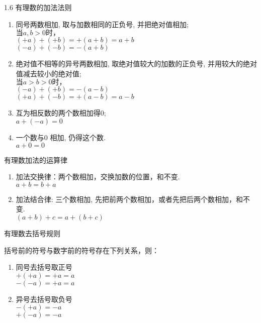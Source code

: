 \documentclass[aspectratio=169]{ctexbeamer} %
\date{\today}
\begin{document}
\begin{frame}[t]{1.6 有理数的加法法则}
\begin{spacing}{1.1} %
\normalsize
\begin{enumerate}[label={\arabic*.}]
\item 同号两数相加, 取与加数相同的正负号, 并把绝对值相加; \\
$\text{当}a,b  > 0\text{时，}$ \\
$(+a) + (+b) = +(a+b) = a + b$ \\
$(-a) + (-b) = -(a+b)$ \\
\item 绝对值不相等的异号两数相加, 取绝对值较大的加数的正负号, 并用较大的绝对值减去较小的绝对值; \\
$\text{当}a > b > 0\text{时，}$ \\
$(-a) + (+b) = -(a-b)$ \\
$(+a) + (-b) = +(a-b) = a - b$ \\
\item 互为相反数的两个数相加得0; \\
 $a + (-a) = 0$ \\
\item 一个数与0 相加, 仍得这个数. \\
$a + 0 = 0 $\\
\end{enumerate}
\end{spacing}
\end{frame}

\begin{frame}[t]{有理数加法的运算律}
\begin{spacing}{1.5} %
\Large
\begin{enumerate}[label={\arabic*.}]
\item 加法交换律：两个数相加，交换加数的位置，和不变. \\
$a + b = b + a$
\item 加法结合律: 三个数相加, 先把前两个数相加，或者先把后两个数相加，和不变. \\
$(a + b) + c = a + (b + c)$
\end{enumerate}
\end{spacing}
\end{frame}

\begin{frame}[t]{有理数去括号规则}
\begin{spacing}{1.5} %
\Large
括号前的符号与数字前的符号存在下列关系，则：\\
\begin{enumerate}[label={\arabic*.}]
\item 同号去括号取正号 \\
$+(+a) = +a = a$ \\
$-(-a) = +a = a$ \\
\item 异号去括号取负号\\
$-(+a) = -a$ \\
$+(-a) = -a$ \\
\end{enumerate}
\end{spacing}
\end{frame}
\end{document}
